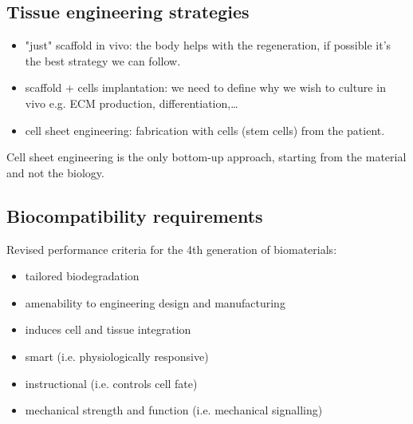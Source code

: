 \subsection{Tissue engineering strategies}
\begin{itemize}
\item "just" scaffold in vivo: the body helps with the regeneration, if possible it’s the best strategy we can follow.
\item scaffold + cells implantation: we need to define why we wish to culture in vivo e.g. ECM production, differentiation,…
\item cell sheet engineering: fabrication with cells (stem cells) from the patient. 
\end{itemize}
\noindent
Cell sheet engineering is the only bottom-up approach, starting from the material and not the biology. 

\subsection{Biocompatibility requirements}
Revised performance criteria for the 4th generation of biomaterials:
\begin{itemize}
\item tailored biodegradation
\item amenability to engineering design and manufacturing
\item induces cell and tissue integration
\item smart (i.e. physiologically responsive)
\item instructional (i.e. controls cell fate)
\item mechanical strength and function (i.e. mechanical signalling)
\end{itemize}

